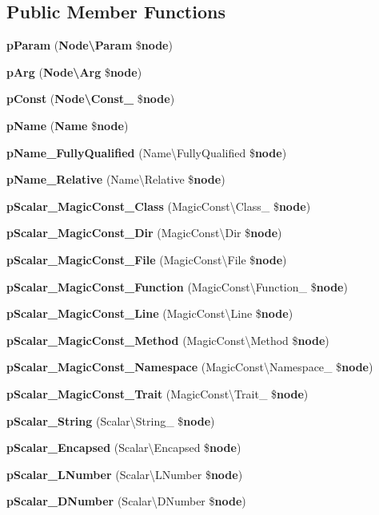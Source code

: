 \subsection*{Public Member Functions}
\begin{DoxyCompactItemize}
\item 
{\bf p\+Param} ({\bf Node\textbackslash{}\+Param} \${\bf node})
\item 
{\bf p\+Arg} ({\bf Node\textbackslash{}\+Arg} \${\bf node})
\item 
{\bf p\+Const} ({\bf Node\textbackslash{}\+Const\+\_\+} \${\bf node})
\item 
{\bf p\+Name} ({\bf Name} \${\bf node})
\item 
{\bf p\+Name\+\_\+\+Fully\+Qualified} (Name\textbackslash{}\+Fully\+Qualified \${\bf node})
\item 
{\bf p\+Name\+\_\+\+Relative} (Name\textbackslash{}\+Relative \${\bf node})
\item 
{\bf p\+Scalar\+\_\+\+Magic\+Const\+\_\+\+Class} (Magic\+Const\textbackslash{}\+Class\+\_\+ \${\bf node})
\item 
{\bf p\+Scalar\+\_\+\+Magic\+Const\+\_\+\+Dir} (Magic\+Const\textbackslash{}\+Dir \${\bf node})
\item 
{\bf p\+Scalar\+\_\+\+Magic\+Const\+\_\+\+File} (Magic\+Const\textbackslash{}\+File \${\bf node})
\item 
{\bf p\+Scalar\+\_\+\+Magic\+Const\+\_\+\+Function} (Magic\+Const\textbackslash{}\+Function\+\_\+ \${\bf node})
\item 
{\bf p\+Scalar\+\_\+\+Magic\+Const\+\_\+\+Line} (Magic\+Const\textbackslash{}\+Line \${\bf node})
\item 
{\bf p\+Scalar\+\_\+\+Magic\+Const\+\_\+\+Method} (Magic\+Const\textbackslash{}\+Method \${\bf node})
\item 
{\bf p\+Scalar\+\_\+\+Magic\+Const\+\_\+\+Namespace} (Magic\+Const\textbackslash{}\+Namespace\+\_\+ \${\bf node})
\item 
{\bf p\+Scalar\+\_\+\+Magic\+Const\+\_\+\+Trait} (Magic\+Const\textbackslash{}\+Trait\+\_\+ \${\bf node})
\item 
{\bf p\+Scalar\+\_\+\+String} (Scalar\textbackslash{}\+String\+\_\+ \${\bf node})
\item 
{\bf p\+Scalar\+\_\+\+Encapsed} (Scalar\textbackslash{}\+Encapsed \${\bf node})
\item 
{\bf p\+Scalar\+\_\+\+L\+Number} (Scalar\textbackslash{}\+L\+Number \${\bf node})
\item 
{\bf p\+Scalar\+\_\+\+D\+Number} (Scalar\textbackslash{}\+D\+Number \${\bf node})

\end{DoxyCompactItemize}
